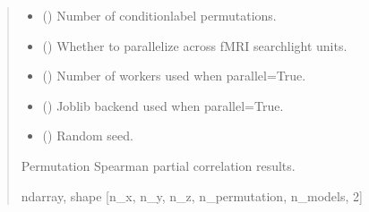 \documentclass[letterpaper,10pt,english]{sphinxhowto}
\begin{document}
\begin{fulllineitems}
\begin{quote}
\begin{description}
\begin{itemize}
\item {} 
\sphinxAtStartPar
{} (\sphinxstyleliteralemphasis{\sphinxupquote{, }}) \textendash{} Number of condition\sphinxhyphen{}label permutations.

\item {} 
\sphinxAtStartPar
{} (\sphinxstyleliteralemphasis{\sphinxupquote{, }}) \textendash{} Whether to parallelize across fMRI searchlight units.

\item {} 
\sphinxAtStartPar
{} (\sphinxstyleliteralemphasis{\sphinxupquote{, }}) \textendash{} Number of workers used when parallel=True.

\item {} 
\sphinxAtStartPar
{} (\sphinxstyleliteralemphasis{\sphinxupquote{, }}\sphinxstyleliteralemphasis{\sphinxupquote{, }}) \textendash{} Joblib backend used when parallel=True.

\item {} 
\sphinxAtStartPar
{} (\sphinxstyleliteralemphasis{\sphinxupquote{, }}) \textendash{} Random seed.

\end{itemize}

\sphinxAtStartPar
{} \textendash{} Permutation Spearman partial correlation results.

\sphinxAtStartPar
ndarray, shape {[}n\_x, n\_y, n\_z, n\_permutation, n\_models, 2{]}

\end{description}\end{quote}

\end{fulllineitems}
\end{document}
